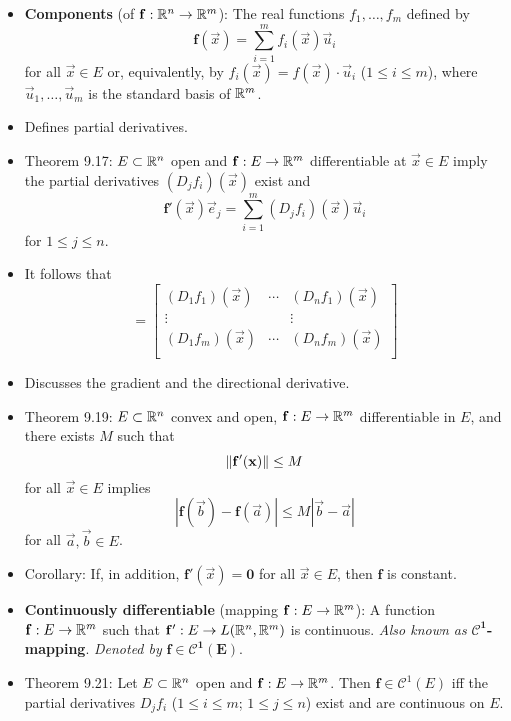 \documentclass[../notes.tex]{subfiles}
\begin{document}
\begin{itemize}
\begin{proof}
    \end{proof}
    \item \textbf{Components} (of $\mathbf{f}:\mathbb{R}^n\to\mathbb{R}^m$): The real functions $f_1,\dots,f_m$ defined by
    \begin{equation*}
        \mathbf{f}(\vec{x}) = \sum_{i=1}^mf_i(\vec{x})\vec{u}_i
    \end{equation*}
    for all $\vec{x}\in E$ or, equivalently, by $f_i(\vec{x})=f(\vec{x})\cdot\vec{u}_i$ ($1\leq i\leq m$), where $\vec{u}_1,\dots,\vec{u}_m$ is the standard basis of $\mathbb{R}^m$.
    \item Defines partial derivatives.
    \item Theorem 9.17: $E\subset\mathbb{R}^n$ open and $\mathbf{f}:E\to\mathbb{R}^m$ differentiable at $\vec{x}\in E$ imply the partial derivatives $(D_jf_i)(\vec{x})$ exist and
    \begin{equation*}
        \mathbf{f}'(\vec{x})\vec{e}_j = \sum_{i=1}^m(D_jf_i)(\vec{x})\vec{u}_i
    \end{equation*}
    for $1\leq j\leq n$.
    \item It follows that
    \begin{equation*}
        [\mathbf{f}'(\vec{x})] =
        \begin{bmatrix}
            (D_1f_1)(\vec{x}) & \cdots & (D_nf_1)(\vec{x})\\
            \vdots &  & \vdots\\
            (D_1f_m)(\vec{x}) & \cdots & (D_nf_m)(\vec{x})\\
        \end{bmatrix}
    \end{equation*}
    \item Discusses the gradient and the directional derivative.
    \item Theorem 9.19: $E\subset\mathbb{R}^n$ convex and open, $\mathbf{f}:E\to\mathbb{R}^m$ differentiable in $E$, and there exists $M$ such that
    \begin{equation*}
        \norm{\mathbf{f}'(\mathbf{x})} \leq M
    \end{equation*}
    for all $\vec{x}\in E$ implies
    \begin{equation*}
        |\mathbf{f}(\vec{b})-\mathbf{f}(\vec{a})| \leq M|\vec{b}-\vec{a}|
    \end{equation*}
    for all $\vec{a},\vec{b}\in E$.
    \item Corollary: If, in addition, $\mathbf{f}'(\vec{x})=\bm{0}$ for all $\vec{x}\in E$, then $\mathbf{f}$ is constant.
    \item \textbf{Continuously differentiable} (mapping $\mathbf{f}:E\to\mathbb{R}^m$): A function $\mathbf{f}:E\to\mathbb{R}^m$ such that $\mathbf{f}':E\to L(\mathbb{R}^n,\mathbb{R}^m)$ is continuous. \emph{Also known as} \textbf{$\bm{\pmb{\mathscr{C}}^1}$-mapping}. \emph{Denoted by} $\bm{\mathbf{f}\in\pmb{\mathscr{C}}^1(E)}$.
    \item Theorem 9.21: Let $E\subset\mathbb{R}^n$ open and $\mathbf{f}:E\to\mathbb{R}^m$. Then $\mathbf{f}\in\mathscr{C}^1(E)$ iff the partial derivatives $D_jf_i$ ($1\leq i\leq m$; $1\leq j\leq n$) exist and are continuous on $E$.
\end{itemize}
\end{document}
